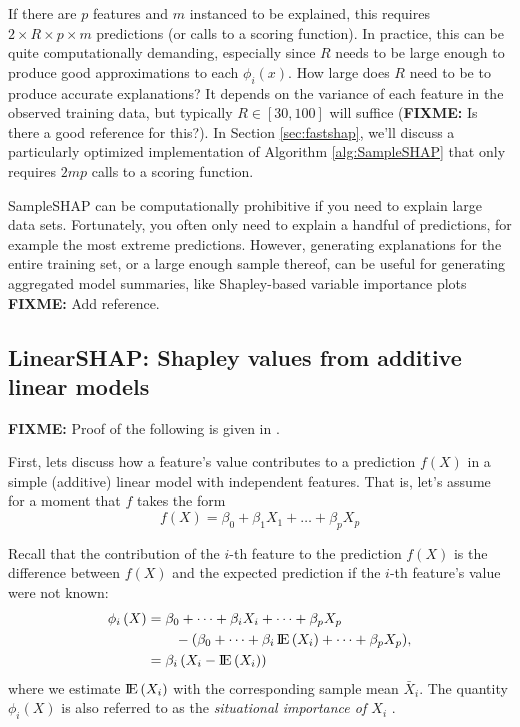 If there are \(p\) features and \(m\) instanced to be explained, this
requires \(2 \times R \times p \times m\) predictions (or calls to a
scoring function). In practice, this can be quite computationally
demanding, especially since \(R\) needs to be large enough to produce
good approximations to each \(\phi_i\left(x\right)\). How large does
\(R\) need to be to produce accurate explanations? It depends on the
variance of each feature in the observed training data, but typically
\(R \in \left[30, 100\right]\) will suffice (\textbf{FIXME:} Is there a
good reference for this?). In Section \ref{sec:fastshap}, we'll discuss
a particularly optimized implementation of Algorithm
\ref{alg:SampleSHAP} that only requires \(2mp\) calls to a scoring
function.

SampleSHAP can be computationally prohibitive if you need to explain
large data sets. Fortunately, you often only need to explain a handful
of predictions, for example the most extreme predictions. However,
generating explanations for the entire training set, or a large enough
sample thereof, can be useful for generating aggregated model summaries,
like Shapley-based variable importance plots \textbf{FIXME:} Add
reference.

\subsection{LinearSHAP: Shapley values from additive linear models \label{sec:LinearSHAP}}

\textbf{FIXME:} Proof of the following is given in
\citet{aas-2020-explaining}.

First, lets discuss how a feature's value contributes to a prediction
\(f\left(X\right)\) in a simple (additive) linear model with independent
features. That is, let's assume for a moment that \(f\) takes the form
\begin{equation}
\nonumber
  f\left(X\right) = \beta_0 + \beta_1 X_1 + \dots + \beta_p X_p
\end{equation}

Recall that the contribution of the \(i\)-th feature to the prediction
\(f\left(X\right)\) is the difference between \(f\left(X\right)\) and
the expected prediction if the \(i\)-th feature's value were not known:
\begin{equation}
\nonumber
\begin{split}
  \phi_i\left(X\right) &= \beta_0 + \dots + \beta_i X_i + \dots + \beta_p X_p \\ &\quad\quad - \left(\beta_0 + \dots + \beta_i \E\left(X_i\right) + \dots + \beta_p X_p\right) \\
  &= \beta_i \left(X_i - \E\left(X_i\right)\right)
\end{split},
\end{equation} where we estimate \(\E\left(X_i\right)\) with the
corresponding sample mean \(\bar{X}_i\). The quantity
\(\phi_i\left(X\right)\) is also referred to as the
\emph{situational importance of $X_i$} \citep{achen-1982-interpreting}.

